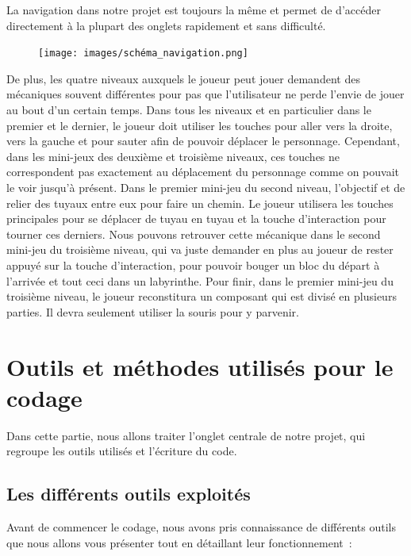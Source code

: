 \documentclass[12pt,a4paper]{article}
\begin{document}
            \newpage

            \tabto{1cm} La navigation dans notre projet est toujours la même et permet de d'accéder directement à la plupart des onglets rapidement et sans difficulté.\\

            \begin{figure}[h]
                \centering
                \texttt{[image: images/schéma\_navigation.png]}\\
            \end{figure}

            \tabto{1cm} De plus, les quatre niveaux auxquels le joueur peut jouer demandent des mécaniques souvent différentes pour pas que l’utilisateur ne perde l’envie de jouer au bout d’un certain temps. Dans tous les niveaux et en particulier dans le premier et le dernier, le joueur doit utiliser les touches pour aller vers la droite, vers la gauche et pour sauter afin de pouvoir déplacer le personnage. Cependant, dans les mini-jeux des deuxième et troisième niveaux, ces touches ne correspondent pas exactement au déplacement du personnage comme on pouvait le voir jusqu’à présent. Dans le premier mini-jeu du second niveau, l’objectif et de relier des tuyaux entre eux pour faire un chemin. Le joueur utilisera les touches principales pour se déplacer de tuyau en tuyau et la touche d’interaction pour tourner ces derniers. Nous pouvons retrouver cette mécanique dans le second mini-jeu du troisième niveau, qui va juste demander en plus au joueur de rester appuyé sur la touche d’interaction, pour pouvoir bouger un bloc du départ à l’arrivée et tout ceci dans un labyrinthe. Pour finir, dans le premier mini-jeu du troisième niveau, le joueur reconstitura un composant qui est divisé en plusieurs parties. Il devra seulement utiliser la souris pour y parvenir.\\
 
    \newpage

    \section{Outils et méthodes utilisés pour le codage}
        \tabto{1cm} Dans cette partie, nous allons traiter l'onglet centrale de notre projet, qui regroupe les outils utilisés et l'écriture du code.

        \subsection{Les différents outils exploités}
            \tabto{1cm} Avant de commencer le codage, nous avons pris connaissance de différents outils que nous allons vous présenter tout en détaillant leur fonctionnement~:\\
            
\end{document}
